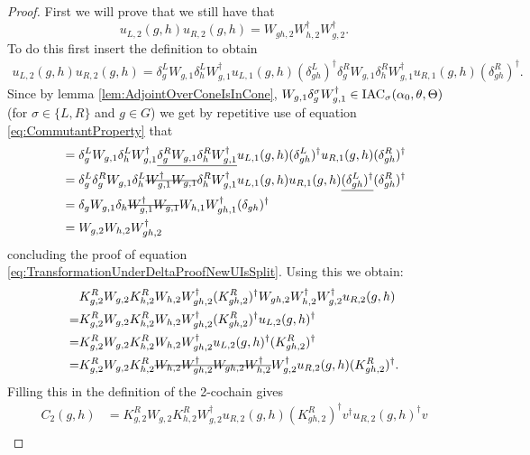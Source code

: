 \documentclass[12pt,a4paper,twoside]{article}
\numberwithin{equation}{section}
\begin{document}
\begin{proof}
	First we will prove that we still have that
	\begin{equation}\label{eq:TransformationUnderDeltaProofNewUIsSplit}
		u_{L,2}(g,h)u_{R,2}(g,h)=W_{gh,2}W_{h,2}^\dagger W_{g,2}^\dagger.
	\end{equation}
	To do this first insert the definition to obtain
	\begin{align}
		u_{L,2}(g,h)u_{R,2}(g,h)=\delta_g^L W_{g,1}\delta_h^L W_{g,1}^\dagger u_{L,1}(g,h)(\delta_{gh}^L)^\dagger \delta_g^R W_{g,1}\delta_h^R W_{g,1}^\dagger u_{R,1}(g,h)(\delta_{gh}^R)^\dagger.
	\end{align}
	Since by lemma \ref{lem:AdjointOverConeIsInCone}, $ W_{g,1}\delta_g^\sigma W_{g,1}^\dagger\in\textrm{IAC}_\sigma(\alpha_0,\theta,\Theta)$ (for $\sigma\in\{L,R\}$ and $g\in G$) we get by repetitive use of equation \eqref{eq:CommutantProperty} that
	\begin{align}
		&=\delta_g^L W_{g,1}\delta_h^L W_{g,1}^\dagger \underline{\delta_g^R W_{g,1}\delta_h^R W_{g,1}^\dagger} u_{L,1}(g,h)(\delta_{gh}^L)^\dagger  u_{R,1}(g,h)(\delta_{gh}^R)^\dagger\\
		&=\delta_g^L \delta_g^R W_{g,1}\delta_h^L \stkout{ W_{g,1}^\dagger W_{g,1}}\delta_h^R W_{g,1}^\dagger u_{L,1}(g,h)  u_{R,1}(g,h)\underline{(\delta_{gh}^L)^\dagger}(\delta_{gh}^R)^\dagger\\
		&=\delta_g W_{g,1}\delta_h \stkout{W_{g,1}^\dagger W_{g,1}} W_{h,1} W_{gh,1}^\dagger(\delta_{gh})^\dagger\\
		&=W_{g,2}W_{h,2}W_{gh,2}^\dagger
	\end{align}
	concluding the proof of equation \eqref{eq:TransformationUnderDeltaProofNewUIsSplit}. Using this we obtain:
	\begin{align}
		&K_{g,2}^RW_{g,2}K_{h,2}^{R}W_{h,2}W_{gh,2}^\dagger(K_{gh,2}^R)^\dagger W_{gh,2}W_{h,2}^\dagger W_{g,2}^\dagger u_{R,2}(g,h)\\
		=&K_{g,2}^RW_{g,2}K_{h,2}^{R}W_{h,2}W_{gh,2}^\dagger(K_{gh,2}^R)^\dagger u_{L,2}(g,h)^\dagger\\
		=&K_{g,2}^RW_{g,2}K_{h,2}^{R}W_{h,2}W_{gh,2}^\dagger u_{L,2}(g,h)^\dagger (K_{gh,2}^R)^\dagger\\
		=&K_{g,2}^RW_{g,2}K_{h,2}^{R}\stkout{W_{h,2}W_{gh,2}^\dagger W_{gh,2}W_{h,2}^\dagger} W_{g,2}^\dagger u_{R,2}(g,h) (K_{gh,2}^R)^\dagger.
	\end{align}
	Filling this in the definition of the 2-cochain gives
	\begin{align}
		C_2(g,h)&=K_{g,2}^RW_{g,2}K_{h,2}^{R}W_{g,2}^\dagger u_{R,2}(g,h) (K_{gh,2}^R)^\dagger v^\dagger u_{R,2}(g,h)^\dagger v\\

\end{align}
\end{proof}
\end{document}

